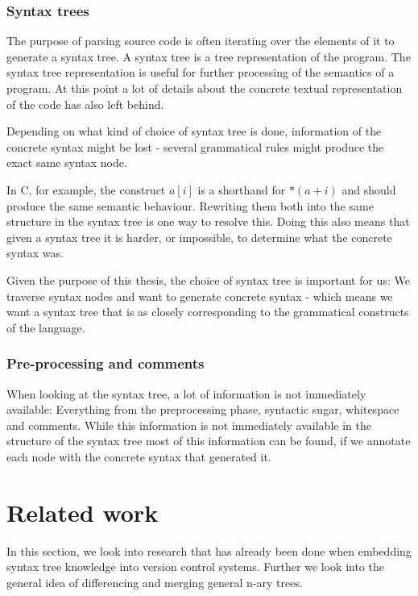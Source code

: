\documentclass[11pt]{article}
\begin{document}
\subsubsection{Syntax trees}
The purpose of parsing source code is often iterating over the elements of it to generate a syntax tree. A syntax tree is a tree representation of the program. The syntax tree representation is useful for further processing of the semantics of a program. At this point a lot of details about the concrete textual representation of the code has also left behind.

Depending on what kind of choice of syntax tree is done, information of the concrete syntax might be lost - several grammatical rules might produce the exact same syntax node.

In C, for example, the construct $a[i]$ is a shorthand for $*(a + i)$ and should produce the same semantic behaviour. Rewriting them both into the same structure in the syntax tree is one way to resolve this. Doing this also means that given a syntax tree it is harder, or impossible, to determine what the concrete syntax was.

Given the purpose of this thesis, the choice of syntax tree is important for us: We traverse syntax nodes and want to generate concrete syntax - which means we want a syntax tree that is as closely corresponding to the grammatical constructs of the language.

\subsubsection{Pre-processing and comments}
When looking at the syntax tree, a lot of information is not immediately available: Everything from the preprocessing phase, syntactic sugar, whitespace and comments. While this information is not immediately available in the structure of the syntax tree most of this information can be found, if we annotate each node with the concrete syntax that generated it. 


\clearpage
\section{Related work}
In this section, we look into research that has already been done when embedding syntax tree knowledge into version control systems. Further we look into the general idea of differencing and merging general n-ary trees.
\end{document}
